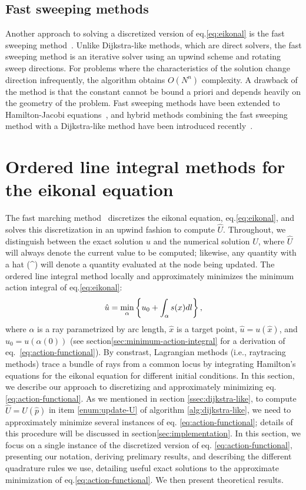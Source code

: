 \documentclass[smallcondensed]{svjour3}
\begin{document}
\subsection{Fast sweeping methods} Another approach to solving a
discretized version of eq.\@ \ref{eq:eikonal} is the fast sweeping
method~\cite{tsai2003fast,zhao2005fast}. Unlike Dijkstra-like methods,
which are direct solvers, the fast sweeping method is an iterative
solver using an upwind scheme and rotating sweep directions. For
problems where the characteristics of the solution change direction
infrequently, the algorithm obtains $O(N^n)$ complexity. A drawback of
the method is that the constant cannot be bound a priori and depends
heavily on the geometry of the problem. Fast sweeping methods have
been extended to Hamilton-Jacobi
equations~\cite{tsai2003fast,kao2008legendre}, and hybrid methods
combining the fast sweeping method with a Dijkstra-like method have
been introduced recently~\cite{chacon2012fast,chacon2015parallel}.

\section{Ordered line integral methods for the eikonal equation}\label{sec:olim}

The fast marching method~\cite{sethian1996fast} discretizes the
eikonal equation, eq.\@ \ref{eq:eikonal}, and solves this
discretization in an upwind fashion to compute $\hat{U}$. Throughout,
we distinguish between the exact solution $u$ and the numerical
solution $U$, where $\hat{U}$ will always denote the current value to
be computed; likewise, any quantity with a hat (\^{}) will denote a
quantity evaluated at the node being updated. The ordered line
integral method locally and approximately minimizes the minimum action
integral of eq.\@ \ref{eq:eikonal}:
\begin{equation}
  \label{eq:action-functional}
  \hat{u} = \min_{\alpha} \left\{u_0 + \int_\alpha s(x) dl\right\},
\end{equation}
where $\alpha$ is a ray parametrized by arc length, $\hat{x}$ is a
target point, $\hat{u} = u(\hat{x})$, and $u_0 = u(\alpha(0))$ (see
section\@ \ref{sec:minimum-action-integral} for a derivation of eq.\
\ref{eq:action-functional}). By constrast, Lagrangian methods (i.e.,
raytracing methods) trace a bundle of rays from a common locus by
integrating Hamilton's equations for the eikonal equation for
different initial conditions. In this section, we describe our
approach to discretizing and approximately minimizing eq.\@
\ref{eq:action-functional}. As we mentioned in section\@
\ref{ssec:dijkstra-like}, to compute $\hat{U} = U(\hat{p})$ in item
\ref{enum:update-U} of algorithm \ref{alg:dijkstra-like}, we need to
approximately minimize several instances of eq.\@
\ref{eq:action-functional}; details of this procedure will be
discussed in section\@ \ref{sec:implementation}. In this section, we
focus on a single instance of the discretized version of eq.\@
\ref{eq:action-functional}, presenting our notation, deriving
prelimary results, and describing the different quadrature rules we
use, detailing useful exact solutions to the approximate minimization
of eq.\@ \ref{eq:action-functional}. We then present theoretical
results.
\end{document}
